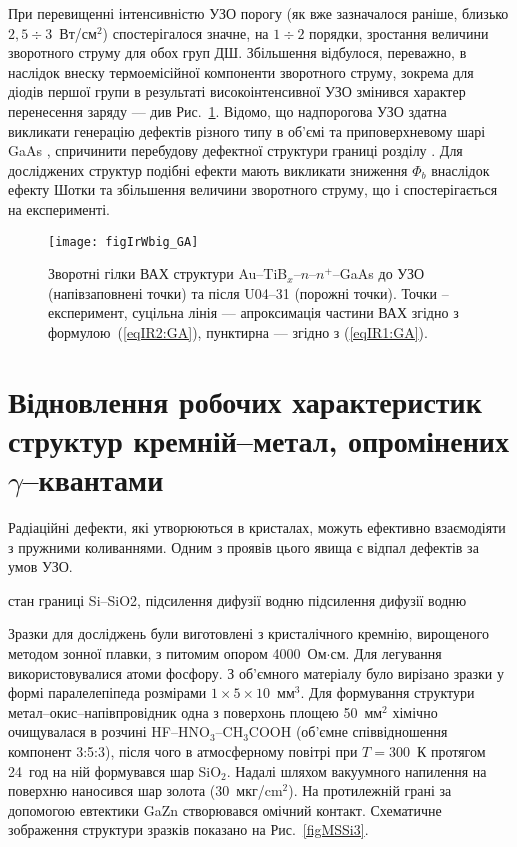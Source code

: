 \documentclass[a4paper,14pt,oneside,openany]{memoir}
\begin{document}
При перевищенні інтенсивністю  УЗО порогу (як вже зазначалося раніше, близько $2,5\div3$~Вт/см$^2$) спостерігалося значне, на $1\div2$ порядки,
зростання величини зворотного струму для обох груп ДШ.
Збільшення відбулося, переважно, в наслідок внеску термоемісійної компоненти зворотного струму, зокрема для діодів першої групи в результаті високоінтенсивної УЗО
змінився характер перенесення заряду --- див Рис.~\ref{figIrWbig_GA}.
Відомо, що надпорогова УЗО здатна викликати генерацію дефектів різного типу в об’ємі та приповерхневому шарі GaAs \cite{Zaver},
спричинити перебудову дефектної структури границі розділу \cite{Parchinskii2003r}.
Для досліджених структур подібні ефекти мають викликати зниження $\Phi_b$ внаслідок ефекту Шотки та збільшення величини зворотного струму, що і спостерігається на експерименті.


\begin{figure}
\center
\texttt{[image: figIrWbig\_GA]}%
\caption{\label{figIrWbig_GA}
Зворотні гілки ВАХ структури Au--TiB$_x$--$n$--$n^+$--GaAs
до УЗО (напівзаповнені точки)
та після U04--31 (порожні точки).
Точки -- експеримент,
суцільна лінія --- апроксимація частини ВАХ згідно з формулою~(\ref{eqIR2:GA}),
пунктирна  --- згідно з (\ref{eqIR1:GA}).
}%
\end{figure}




\section{Відновлення робочих характеристик структур кремній--метал, опромінених $\gamma$--квантами}

Радіаційні дефекти, які утворюються в кристалах, можуть ефективно взаємодіяти з пружними коливаннями.
Одним з проявів цього явища є відпал дефектів за умов УЗО.



\cite{Ostap:SiO2} стан границі Si--SiO2, підсилення дифузії водню
\cite{Ostap:PhotoLum,ostapenko1997} підсилення дифузії водню



Зразки для досліджень були виготовлені з кристалічного кремнію, вирощеного методом зонної плавки, з питомим опором 4000~Ом$\cdot$см.
Для легування використовувалися атоми фосфору.
З об'ємного матеріалу було вирізано зразки у формі паралелепіпеда розмірами $1\times5\times10$~мм$^3$.
Для формування структури метал--окис--напівпровідник одна з поверхонь площею 50~мм$^2$ хімічно очищувалася в розчині HF--HNO$_3$--CH$_3$COOH (об'ємне співвідношення компонент 3:5:3),
після чого в атмосферному повітрі при $T=300$~К протягом 24~год на ній формувався шар SiO$_2$.
Надалі шляхом вакуумного напилення на поверхню наносився шар золота (30~мкг/cm$^2$).
На протилежній грані за допомогою евтектики GaZn створювався омічний контакт.
Схематичне зображення структури зразків показано на Рис.~\ref{figMSSi3}.
\end{document}
